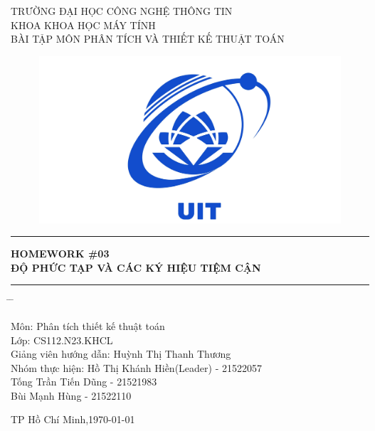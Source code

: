 \documentclass[10pt,a4paper]{article}
\begin{document}
\fontsize{18}{30}\selectfont
{\centering TRƯỜNG ĐẠI HỌC CÔNG NGHỆ THÔNG TIN \\
KHOA KHOA HỌC MÁY TÍNH \\
BÀI TẬP MÔN PHÂN TÍCH VÀ THIẾT KẾ THUẬT TOÁN
\par}
\vspace{0.5 cm}
\begin{center}
    \begin{figure}[htp]
     \centering\includegraphics[scale=.3]{images/logo_uit.jpg} \\
    \end{figure}
    \vspace{1 cm}
    
    \par\noindent\rule{\textwidth}{0.5pt}
    \fontsize{14}{30}\selectfont
    {\centering \textbf{HOMEWORK \#03 \\
    ĐỘ PHỨC TẠP VÀ CÁC KÝ HIỆU TIỆM CẬN} \\
    }
    \par\noindent\rule{\textwidth}{0.5pt}
    
    \fontsize{14}{30}\selectfont
    \begin{tabbing}
    \hspace{2 in} \= \hspace{2 in} \= \kill

    Môn: \> Phân tích thiết kế thuật toán \\
    Lớp: \> CS112.N23.KHCL \\
    Giảng viên hướng dẫn: \> Huỳnh Thị Thanh Thương \\
    Nhóm thực hiện: \> Hồ Thị Khánh Hiền(Leader) - 21522057 \\
    \hspace{5.3 cm}Tống Trần Tiến Dũng - 21521983 \\
    \hspace{5.3 cm}Bùi Mạnh Hùng - 21522110 \\
    \end{tabbing}  

    \begin{center}
    \fontsize{14}{30}\selectfont
     TP Hồ Chí Minh,{\today}
    \end{center}
\end{center}
\newpage
\fontsize{13}{15}\selectfont
\tableofcontents
\newpage
\end{document}
